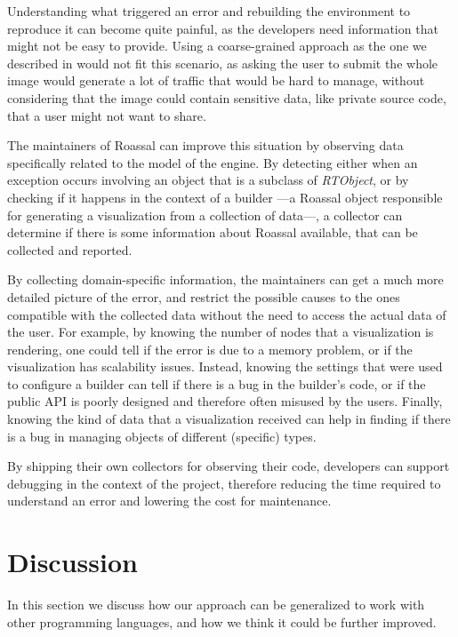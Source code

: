 Understanding what triggered an error and rebuilding the environment to reproduce it can become quite painful, as the developers need information that might not be easy to provide.
Using a coarse-grained approach as the one we described in  would not fit this scenario, as asking the user to submit the whole image would generate a lot of traffic that would be hard to manage, without considering that the image could contain sensitive data, like private source code, that a user might not want to share.

The maintainers of Roassal can improve this situation by observing data specifically related to the model of the engine.
By detecting either when an exception occurs involving an object that is a subclass of \textit{RTObject}, or by checking if it happens in the context of a builder ---a Roassal object responsible for generating a visualization from a collection of data---, a collector can determine if there is some information about Roassal available, that can be collected and reported.

By collecting domain-specific information, the maintainers can get a much more detailed picture of the error, and restrict the possible causes to the ones compatible with the collected data without the need to access the actual data of the user.
For example, by knowing the number of nodes that a visualization is rendering, one could tell if the error is due to a memory problem, or if the visualization has scalability issues.
Instead, knowing the settings that were used to configure a builder can tell if there is a bug in the builder's code, or if the public API is poorly designed and therefore often misused by the users.
Finally, knowing the kind of data that a visualization received can help in finding if there is a bug in managing objects of different (specific) types.

By shipping their own collectors for observing their code, developers can support debugging in the context of the project, therefore reducing the time required to understand an error and lowering the cost for maintenance.



\section{Discussion}\label{sec:reified-discussion}

In this section we discuss how our approach can be generalized to work with other programming languages, and how we think it could be further improved.

